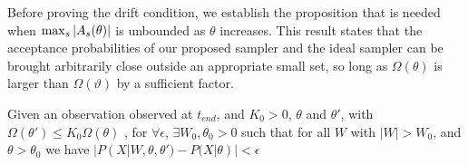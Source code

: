 \noindent Before proving the drift condition, we establish the proposition that
is needed when ${\max_s |A_s(\theta)|}$ is unbounded as $\theta$ increases.
This result states that the acceptance probabilities of our proposed
sampler and the ideal sampler can be brought arbitrarily close
outside an appropriate small set, so long as $\Omega(\theta)$ is larger
than $\Omega(\vartheta)$ by a sufficient factor. 

\begin{lemma}
Given an observation observed at $t_{end}$, and $K_0 > 0$, $\theta$ and $\theta'$, with $\Omega(\theta') \leq K_0 \Omega(\theta)$ 
, for $\forall \epsilon$, $\exists  W_0, \theta_0 > 0$ such that for all $W$ with $|W| > W_0$, and $\theta > \theta_0$ we have $|P(X| W, \theta, \theta') - P(X | \theta)| < \epsilon$
\label{lem:eigenvalue_lemma}
\end{lemma}
